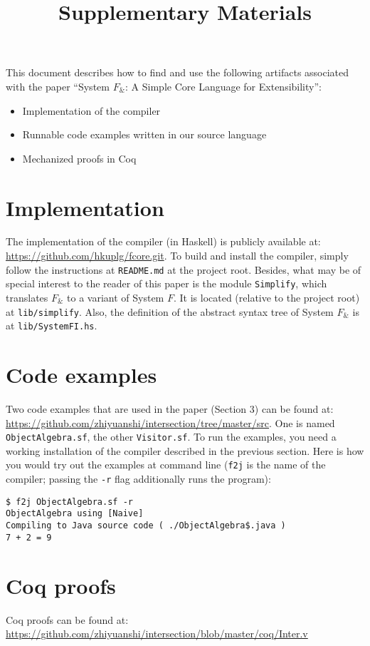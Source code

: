 \documentclass{article}
\begin{document}
\title{Supplementary Materials}
\maketitle

This document describes how to find and use the following artifacts associated
with the paper ``System $F_\&$: A Simple Core Language for Extensibility'':

\begin{itemize}
  \item Implementation of the compiler
  \item Runnable code examples written in our source language
  \item Mechanized proofs in Coq
\end{itemize}

\section*{Implementation}

The implementation of the compiler (in Haskell) is publicly available at:
\url{https://github.com/hkuplg/fcore.git}. To build and install the compiler,
simply follow the instructions at \texttt{README.md} at the project root. Besides,
what may be of special interest to the reader of this paper is the module
\texttt{Simplify}, which translates $ F_\&$ to a variant of System $F$. It is
located (relative to the project root) at \texttt{lib/simplify}.
Also, the definition of the abstract syntax tree of System $F_\&$
is at \texttt{lib/SystemFI.hs}.

\section*{Code examples}

Two code examples that are used in the paper (Section 3) can be found at:
\url{https://github.com/zhiyuanshi/intersection/tree/master/src}. One is named
\texttt{ObjectAlgebra.sf}, the other \texttt{Visitor.sf}. To run the examples,
you need a working installation of the compiler described in the previous
section. Here is how you would try out the examples at command line
(\texttt{f2j} is the name of the compiler; passing the \texttt{-r} flag
additionally runs the program):
\begin{lstlisting}
$ f2j ObjectAlgebra.sf -r
ObjectAlgebra using [Naive]
Compiling to Java source code ( ./ObjectAlgebra$.java )
7 + 2 = 9
\end{lstlisting}

\section*{Coq proofs}

Coq proofs can be found at:
\url{https://github.com/zhiyuanshi/intersection/blob/master/coq/Inter.v}
\end{document}
